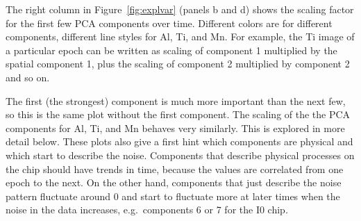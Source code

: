 \documentclass[]{spie}  %
\begin{document}
The right column in Figure~\ref{fig:explvar} (panels b and d) shows the scaling factor for the first few PCA components over time. Different colors are for different components, different line styles for Al, Ti, and Mn. For example, the Ti image of a particular epoch can be written as scaling of component 1 multiplied by the spatial component 1, plus the scaling of component 2 multiplied by component 2 and so on.

The first (the strongest) component is much more important than the next few, so this is the same plot without the first component. The scaling of the the PCA components for Al, Ti, and Mn behaves very similarly. This is explored in more detail below. These plots also give a first hint which components are physical and which start to describe the noise. Components that describe physical processes on the chip should have trends in time, because the values are correlated from one epoch to the next. On the other hand, components that just describe the noise pattern fluctuate around 0 and start to fluctuate more at later times when the noise in the data increases, e.g.\ components 6 or 7 for the I0 chip.
\end{document}
